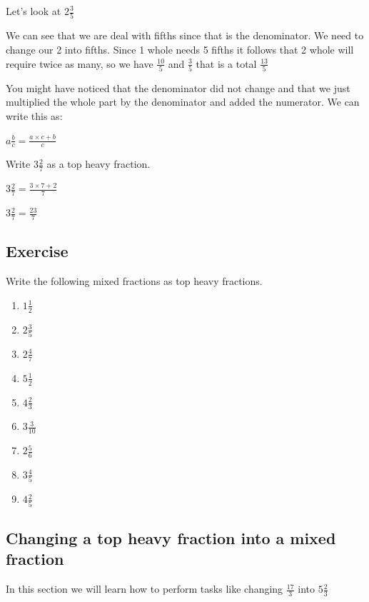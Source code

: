 Let's look at $\displaystyle 2 \frac{3}{5}$

\bigskip

\noindent We can see that we are deal with fifths since that is the denominator.  We need to change our 2 into fifths.  Since 1 whole needs 5 fifths it follows that 2 whole will require twice as many, so we have $\frac{10}{5}$ and $\frac{3}{5}$ that is a total $\frac{13}{5}$

\noindent You might have noticed that the denominator did not change and that we just multiplied the whole part by the denominator and added the numerator.  We can write this as:\bigskip

$\displaystyle a \frac{b}{c} = \frac{a \times c + b}{c}$

\begin{exmp}
Write $\displaystyle 3 \frac{2}{7}$ as a top heavy fraction.\bigskip

$\displaystyle 3 \frac{2}{7} = \frac{3 \times 7 + 2}{7}$

\bigskip

$\displaystyle 3 \frac{2}{7} = \frac{23}{7}$\bigskip
\end{exmp}
\subsection{Exercise}
Write the following mixed fractions as top heavy fractions.
\begin{multicols}{3}
\begin{enumerate}
	\item $\displaystyle 1 \frac{1}{2}$
	\item $\displaystyle 2 \frac{3}{5}$
	\item $\displaystyle 2 \frac{4}{7}$
	\item $\displaystyle 5 \frac{1}{2}$
	\item $\displaystyle 4 \frac{2}{3}$
	\item $\displaystyle 3 \frac{3}{10}$
	\item $\displaystyle 2 \frac{5}{6}$
	\item $\displaystyle 3 \frac{4}{5}$
	\item $\displaystyle 4 \frac{2}{5}$
\end{enumerate}
\end{multicols}

\subsection{Changing a top heavy fraction into a mixed fraction}
In this section we will learn how to perform tasks like changing $\displaystyle \frac{17}{3}$ into $\displaystyle 5 \frac{2}{3}$

